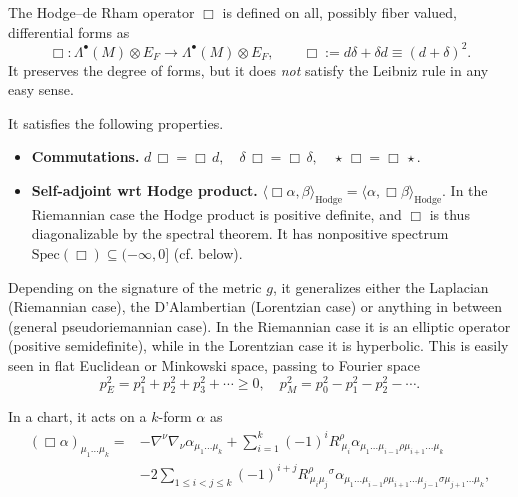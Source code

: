 \documentclass[../geometry_main.tex]{subfiles}
\begin{document}
\begin{mytheorem}
%
The Hodge--de Rham operator \(\Box\) is defined on all, possibly fiber valued, differential forms as
\begin{equation}
    \Box: \Lambda^\bullet(M) \otimes E_F \to \Lambda^\bullet(M) \otimes E_F, \qquad \Box := d \delta + \delta d \equiv (d + \delta)^2.
\end{equation}
It preserves the degree of forms, but it does \emph{not} satisfy the Leibniz rule in any easy sense.
\smallskip

It satisfies the following properties.
\begin{itemize}
    \item \textbf{Commutations.} $d \,\Box = \Box\, d,\quad \delta\, \Box = \Box\, \delta,\quad \star\, \Box = \Box\, \star$.
    \item \textbf{Self-adjoint wrt Hodge product.} \(\langle \Box \alpha, \beta \rangle_{\mathrm{Hodge}} = \langle \alpha, \Box \beta \rangle_{\mathrm{Hodge}}\).
    In the Riemannian case the Hodge product is positive definite, and $\Box$ is thus diagonalizable by the spectral theorem.
    It has nonpositive spectrum $\text{Spec}(\Box)\subseteq (-\infty,0]$ (cf. below).
\end{itemize}
\smallskip

Depending on the signature of the metric \(g\), it generalizes either the Laplacian (Riemannian case), the D'Alambertian (Lorentzian case) or anything in between (general pseudoriemannian case). 
In the Riemannian case it is an elliptic operator (positive semidefinite), while in the Lorentzian case it is hyperbolic.
This is easily seen in flat Euclidean or Minkowski space, passing to Fourier space
\begin{equation}
    p_E^2 = p_1^2 + p_2^2 + p_3^2 + \cdots \geq 0,\quad p_M^2 = p_0^2 - p_1^2 - p_2^2 - \cdots.
\end{equation}
\smallskip

In a chart, it acts on a $k$-form $\alpha$ as
\begin{align}
    (\Box \alpha)_{\mu_1 \dots \mu_k} 
    =& - \nabla^{\nu} \nabla_{\nu} \alpha_{\mu_1 \dots \mu_k} + \sum_{i=1}^k (-1)^i R^{\rho}_{\ \mu_i} \alpha_{\mu_1 \dots \mu_{i-1} \rho \mu_{i+1} \dots \mu_k} 
    \\
    &  - 2 \sum_{1\leq i < j \leq k} (-1)^{i+j} R^{\rho}_{\,\mu_i \mu_j}{}^{\sigma} \alpha_{\mu_1 \dots \mu_{i-1} \rho \mu_{i+1} \dots \mu_{j-1} \sigma \mu_{j+1} \dots \mu_k},
\end{align}


\end{mytheorem}
\end{document}
